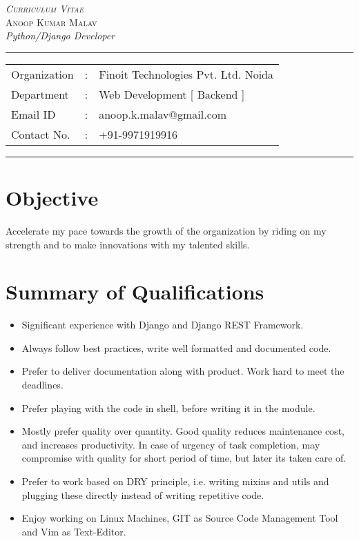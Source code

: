 \documentclass[10pt]{article}
\begin{document}
\begin{center}

\textsc{\huge \textit{Curriculum Vitae}}
\\[0.5cm]
\textsc{\Large Anoop Kumar Malav}
 \\[0.1cm]

\textit{\large Python/Django Developer} \\
\addvspace{0.04cm}
\rule[0.07cm]{17.52cm}{0.01cm}
\begin{tabular}{l c l}
Organization      &:& Finoit Technologies Pvt. Ltd. Noida \\
Department        &:& Web Development [ Backend ] \\
Email ID          &:& anoop.k.malav@gmail.com \\
Contact No.       &:& +91-9971919916 \\
\end{tabular}

\addvspace{0.02cm}
\rule[0.02cm]{17.52cm}{0.01cm}
\end{center}

\section*{Objective}
Accelerate my pace towards the growth of the organization by riding on my strength and
to make innovations with my talented skills.

\section*{Summary of Qualifications}

\begin{itemize}
 \item Significant experience with Django and Django REST Framework.
 \item Always follow best practices, write well formatted and documented code.
 \item Prefer to deliver documentation along with product. Work hard to meet the deadlines.
 \item Prefer playing with the code in shell, before writing it in the module.
 \item Mostly prefer quality over quantity. Good quality reduces maintenance cost, and increases productivity. In case of urgency of task completion, may compromise with quality for short period of time, but later its taken care of.
 \item Prefer to work based on DRY principle, i.e. writing mixins and utils and plugging these directly instead of writing repetitive code.
 \item Enjoy working on Linux Machines, GIT as Source Code Management Tool and Vim as Text-Editor.
\end{itemize}
\end{document}
